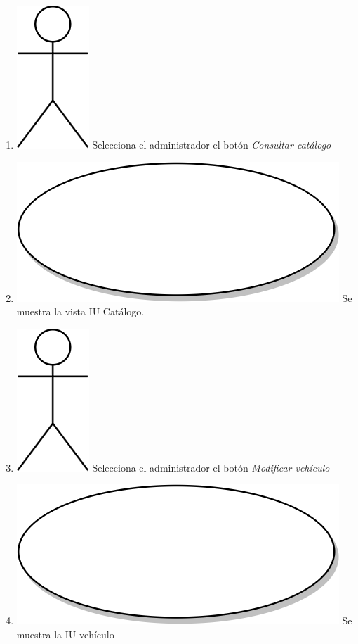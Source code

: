 \begin{enumerate}
  \item {\includegraphics[scale=.1]{Capitulo3/img/actor.png} Selecciona el administrador el botón \textit{Consultar catálogo}}
  \item {\includegraphics[scale=.05]{Capitulo3/img/proceso.png} Se muestra la vista IU Catálogo.}
  \item {\includegraphics[scale=.1]{Capitulo3/img/actor.png} Selecciona el administrador el botón \textit{Modificar vehículo}}
  \item {\includegraphics[scale=.05]{Capitulo3/img/proceso.png} Se muestra la IU vehículo }

\end{enumerate}
